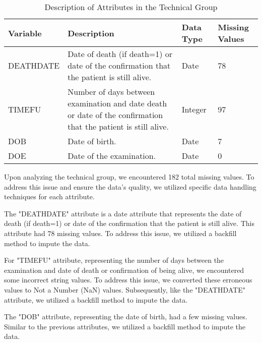         \begin{table}[H]
            \centering
            \caption{Description of Attributes in the Technical Group}
            \label{tab:technical group attributes}
            \begin{adjustbox}{center}
                 \begin{tabular}{|p{2.6cm}|p{10cm}|p{1.6cm}|p{1.8cm}|}
                    \hline
                    \textbf{Variable} &
                      \textbf{Description} &
                      \textbf{Data Type} &
                      \textbf{Missing Values} \\ \hline
                    DEATHDATE &
                      Date of death (if death=1) or date of the confirmation that the patient is still alive. &
                      Date &
                      78 \\
                    TIMEFU &
                      Number of days between examination and date death or date of the confirmation that the patient is still alive. &
                      Integer &
                      97 \\
                    DOB & Date of birth.           & Date & 7 \\
                    DOE & Date of the examination. & Date & 0 \\ \hline
                    \end{tabular}
            \end{adjustbox}
        \end{table}

        Upon analyzing the technical group, we encountered 182 total missing values. To address this issue and ensure the data's quality, we utilized specific data handling techniques for each attribute.

        The "DEATHDATE" attribute is a date attribute that represents the date of death (if death=1) or date of the confirmation that the patient is still alive. This attribute had 78 missing values. To address this issue, we utilized a backfill method to impute the data. 

        For "TIMEFU" attribute, representing the number of days between the examination and date of death or confirmation of being alive, we encountered some incorrect string values. To address this issue, we converted these erroneous values to Not a Number (NaN) values. Subsequently, like the "DEATHDATE" attribute, we utilized a backfill method to impute the data.

        The "DOB" attribute, representing the date of birth, had a few missing values. Similar to the previous attributes, we utilized a backfill method to impute the data.

